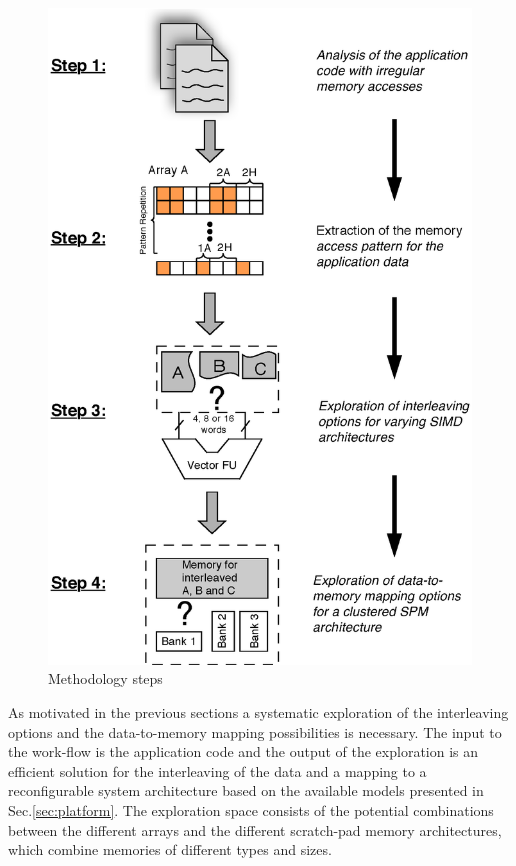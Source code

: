 \documentclass[prodmode,acmtecs]{acmsmall}
\begin{document}
\begin{figure}
\centering
	\includegraphics[scale = 0.6]{Images/workflow2.eps} 
	\caption{Methodology steps}
	\label{fig:workflow}
\end{figure}

As motivated in the previous sections a systematic exploration of the interleaving options and the data-to-memory mapping possibilities is necessary.
The input to the work-flow is the application code and the output of the exploration is an efficient solution for the interleaving of the data and a mapping to a reconfigurable system architecture based on the available models presented in Sec.\ref{sec:platform}.
The exploration space consists of the potential combinations between the different arrays and the different scratch-pad memory architectures, which combine memories of different types and sizes.
\end{document}
